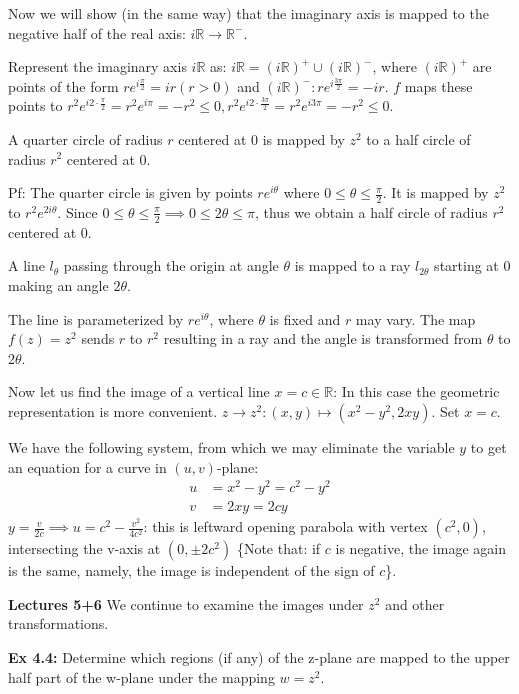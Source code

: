 \documentclass{article}
\begin{document}
Now we will show (in the same way) that the imaginary axis is mapped to the negative half of the real axis: $i\mathbb{R} \to \mathbb{R}^-$.

Represent the imaginary axis $i\mathbb{R}$ as: $i\mathbb{R} = (i\mathbb{R})^+ \cup (i\mathbb{R})^-$, where $(i\mathbb{R})^+$ are points of the form $re^{i\frac{\pi}{2}} = ir (r > 0)$ and $(i\mathbb{R})^-: re^{i\frac{3\pi}{2}} = -ir$. $f$ maps these points to $r^2 e^{i2 \cdot \frac{\pi}{2}} = r^2 e^{i\pi} = -r^2 \leq 0, r^2 e^{i2 \cdot \frac{3\pi}{2}} = r^2 e^{i3\pi} = -r^2 \leq 0$.

A quarter circle of radius $r$ centered at 0 is mapped by $z^2$ to a half circle of radius $r^2$ centered at 0.

Pf: The quarter circle is given by points $re^{i\theta}$ where $0 \leq \theta \leq \frac{\pi}{2}$. It is mapped by $z^2$ to $r^2 e^{2i\theta}$. Since $0 \leq \theta \leq \frac{\pi}{2} \implies 0 \leq 2\theta \leq \pi$, thus we obtain a half circle of radius $r^2$ centered at 0.

A line $l_\theta$ passing through the origin at angle $\theta$ is mapped to a ray $l_{2\theta}$ starting at 0 making an angle $2\theta$.

The line is parameterized by $re^{i\theta}$, where $\theta$ is fixed and $r$ may vary. The map $f(z) = z^2$ sends $r$ to $r^2$ resulting in a ray and the angle is transformed from $\theta$ to $2\theta$.

Now let us find the image of a vertical line $x = c \in \mathbb{R}$: In this case the geometric representation is more convenient. $z \to z^2: (x, y) \mapsto (x^2 - y^2, 2xy)$. Set $x = c$.

We have the following system, from which we may eliminate the variable $y$ to get an equation for a curve in $(u, v)$-plane:
\begin{align*}
u &= x^2 - y^2 = c^2 - y^2 \\
v &= 2xy = 2cy
\end{align*}
$y = \frac{v}{2c} \implies u = c^2 - \frac{v^2}{4c^2}$: this is leftward opening parabola with vertex $(c^2, 0)$, intersecting the v-axis at $(0, \pm 2c^2)$ \{Note that: if $c$ is negative, the image again is the same, namely, the image is independent of the sign of $c$\}.

\textbf{Lectures 5+6}
We continue to examine the images under $z^2$ and other transformations.

\textbf{Ex 4.4:} Determine which regions (if any) of the z-plane are mapped to the upper half part of the w-plane under the mapping $w = z^2$.
\end{document}
